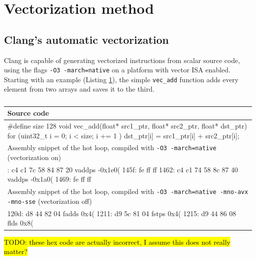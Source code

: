 \documentclass[logo,bsc,singlespacing,parskip]{infthesis}
\newenvironment{VerbatimCompact}
  {\vspace*{-2.5mm}\VerbatimEnvironment
   \par\Verbatim}
  {\endVerbatim\vspace*{-2.4mm}}
\begin{document}
\section{Vectorization method}

\subsection{Clang's automatic vectorization}
Clang is capable of generating vectorized instructions from scalar source code,
using the flags \texttt{-O3 -march=native} on a platform with vector ISA
enabled. Starting with an example (Listing \ref{vec-add-float-auto}), the simple
\texttt{vec\_add} function adds every element from two arrays and saves it to
the third. 

\begin{table}[ht]\captionsetup{name=Listing}
\begin{tabular}{>{\raggedright\arraybackslash}p{14cm}}
    Source code\\
    \midrule
    \begin{VerbatimCompact}
#define size 128
void vec_add(float* src1_ptr, float* src2_ptr, float* dst_ptr) {
    for (uint32_t i = 0; i < size; i += 1 ){
        dst_ptr[i] = src1_ptr[i] + src2_ptr[i];
    }
}
    \end{VerbatimCompact}
    \\

    Assembly snippet of the hot loop, compiled with \texttt{-O3 -march=native}
    (vectorization on)\\
    \midrule
    \begin{VerbatimCompact}
1458: c4 c1 7c 58 84 87 20   vaddps -0x1e0(%
145f: fe ff ff
1462: c4 c1 74 58 8c 87 40   vaddps -0x1a0(%
1469: fe ff ff
    \end{VerbatimCompact}
    \\

    Assembly snippet of the hot loop, compiled with \texttt{-O3 -march=native
    -mno-avx -mno-sse} (vectorization off)\\
    \midrule
    \begin{VerbatimCompact}
120d: d8 44 82 04    fadds  0x4(%
1211: d9 5c 81 04    fstps  0x4(%
1215: d9 44 86 08    flds   0x8(%
    \end{VerbatimCompact}
\end{tabular}
\caption{}
\label{vec-add-float-auto}
\end{table}
\hl{TODO: these hex code are actually incorrect, I assume this does not really matter?}
\end{document}
